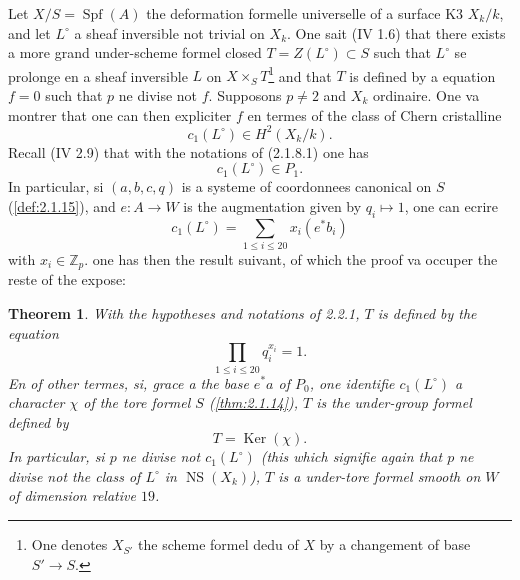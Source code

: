 \documentclass[12pt,a4paper]{article}
\theoremstyle{plain}
\newtheorem{theorem}{Theorem}[section]
\theoremstyle{definition}
\theoremstyle{remark}
\DeclareMathOperator{\Ker}{Ker}
\DeclareMathOperator{\Spf}{Spf}
\providecommand{\Ker}{\operatorname{Ker}}
\providecommand{\NS}{\operatorname{NS}}
\begin{document}
\subsubsection{}
Let $X/S = \Spf(A)$ the deformation formelle universelle of a surface K3 $X_k/k$, and let $L^\circ$ a sheaf inversible not trivial on $X_k$. One sait (IV 1.6) that there exists a more grand under-scheme formel closed $T = Z(L^\circ) \subset S$ such that $L^\circ$ se prolonge en a sheaf inversible $L$ on $X \times_S T$\footnote{One denotes $X_{S'}$ the scheme formel dedu of $X$ by a changement of base $S' \to S$.} and that $T$ is defined by a equation $f = 0$ such that $p$ ne divise not $f$. Supposons $p \neq 2$ and $X_k$ ordinaire. One va montrer that one can then expliciter $f$ en termes of the class of Chern cristalline
\begin{equation}\tag{2.2.1.1}
c_1(L^\circ) \in H^2(X_k/k). 
\end{equation}
Recall (IV 2.9) that with the notations of (2.1.8.1) one has
\begin{equation}\tag{2.2.1.2}
c_1(L^\circ) \in P_1. 
\end{equation}
In particular, si $(a, b, c, q)$ is a systeme of coordonnees canonical on $S$ (\ref{def:2.1.15}), and $e : A \to W$ is the augmentation given by $q_i \mapsto 1$, one can ecrire
\begin{equation}\tag{2.2.1.3}
c_1(L^\circ) = \sum_{1\leqslant i\leqslant 20} x_i (e^*b_i) 
\end{equation}
with $x_i \in \mathbb{Z}_p$. one has then the result suivant, of which the proof va occuper the reste of the expose:

\begin{theorem}\label{thm:2.2.2}
With the hypotheses and notations of 2.2.1, $T$ is defined by the equation
\begin{equation}\tag{2.2.2.1}
\prod_{1\leqslant i\leqslant 20} q_i^{x_i} = 1. 
\end{equation}
En of other termes, si, grace a the base $e^*a$ of $P_0$, one identifie $c_1(L^\circ)$ a character $\chi$ of the tore formel $S$ (\ref{thm:2.1.14}), $T$ is the under-group formel defined by
\begin{equation}\tag{2.2.2.2}
T = \Ker(\chi). 
\end{equation}
In particular, si $p$ ne divise not $c_1(L^\circ)$ (this which signifie again \cite[1.4]{Ogus1979} that $p$ ne divise not the class of $L^\circ$ in $\NS(X_k)$), $T$ is a under-tore formel smooth on $W$ of dimension relative $19$.
\end{theorem}
\end{document}
